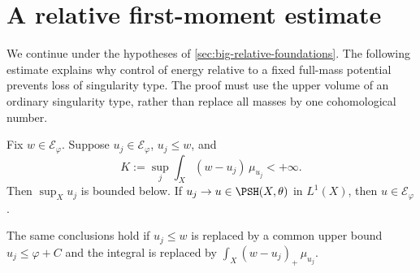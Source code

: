 \section{A relative first-moment estimate}
\label{sec:big-relative-first-moment}

We continue under the hypotheses of \cref{sec:big-relative-foundations}. The following estimate explains why control of energy relative to a fixed full-mass potential prevents loss of singularity type. The proof must use the upper volume of an ordinary singularity type, rather than replace all masses by one cohomological number.

\begin{proposition}\label{prop:big-relative-first-moment}
Fix $w\in\mathcal E_\varphi$. Suppose $u_j\in\mathcal E_\varphi$, $u_j\leq w$, and
\[
 K:=\sup_j\int_X(w-u_j)\,\mu_{u_j}<+\infty.
\]
Then $\sup_Xu_j$ is bounded below. If $u_j\to u\in\PSH(X,\theta)$ in $L^1(X)$, then $u\in\mathcal E_\varphi$.

The same conclusions hold if $u_j\leq w$ is replaced by a common upper bound $u_j\leq\varphi+C$ and the integral is replaced by $\int_X(w-u_j)_+\,\mu_{u_j}$.
\end{proposition}
